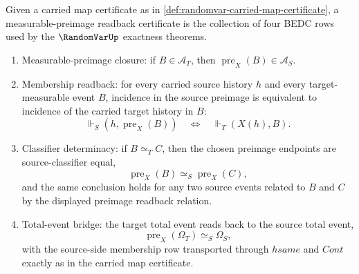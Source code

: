 \begin{definition}
\label{def:randomvar-measurable-preimage-readback-certificate}
Given a carried map certificate as in \autoref{def:randomvar-carried-map-certificate}, a measurable-preimage readback certificate is the collection of four BEDC rows used by the $\RandomVarUp$ exactness theorems.

\begin{enumerate}
\item Measurable-preimage closure: if $B\in\mathcal A_T$, then $\operatorname{pre}_X(B)\in\mathcal A_S$.

\item Membership readback: for every carried source history $h$ and every target-measurable event $B$, incidence in the source preimage is equivalent to incidence of the carried target history in $B$:
$$
\Vdash_S(h,\operatorname{pre}_X(B))
\quad\Longleftrightarrow\quad
\Vdash_T(X(h),B).
$$

\item Classifier determinacy: if $B\simeq_T C$, then the chosen preimage endpoints are source-classifier equal,
$$
\operatorname{pre}_X(B)\simeq_S\operatorname{pre}_X(C),
$$
and the same conclusion holds for any two source events related to $B$ and $C$ by the displayed preimage readback relation.

\item Total-event bridge: the target total event reads back to the source total event,
$$
\operatorname{pre}_X(\Omega_T)\simeq_S\Omega_S,
$$
with the source-side membership row transported through $hsame$ and $Cont$ exactly as in the carried map certificate.
\end{enumerate}
\end{definition}


